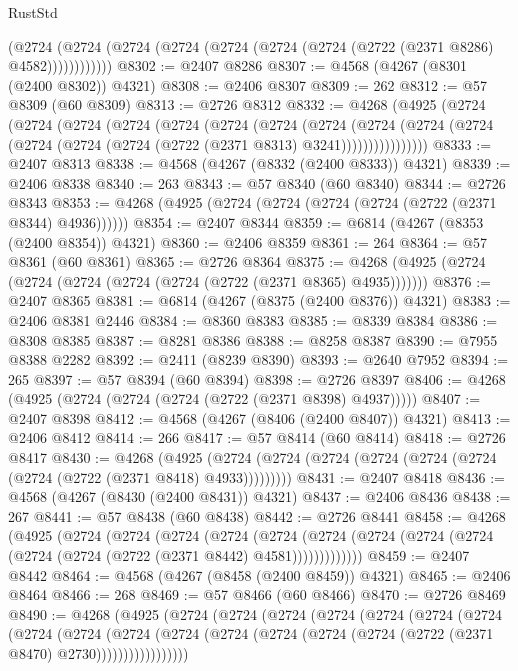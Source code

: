 \begin{lexlean}{RustStd}
\begin{coremodule}
            (@2724 (@2724 (@2724 (@2724 (@2724 (@2724 (@2724 (@2722 (@2371 @8286) @4582))))))))))))
@8302 := @2407 @8286
@8307 := @4568 (@4267 (@8301 (@2400 @8302)) @4321)
@8308 := @2406 @8307
@8309 := 262
@8312 := @57 @8309 (@60 @8309)
@8313 := @2726 @8312
@8332 := @4268
    (@4925
      (@2724
        (@2724
          (@2724
            (@2724
              (@2724
                (@2724
                  (@2724
                    (@2724
                      (@2724
                        (@2724
                          (@2724 (@2724 (@2724 (@2724 (@2722 (@2371 @8313) @3241))))))))))))))))
@8333 := @2407 @8313
@8338 := @4568 (@4267 (@8332 (@2400 @8333)) @4321)
@8339 := @2406 @8338
@8340 := 263
@8343 := @57 @8340 (@60 @8340)
@8344 := @2726 @8343
@8353 := @4268 (@4925 (@2724 (@2724 (@2724 (@2724 (@2722 (@2371 @8344) @4936))))))
@8354 := @2407 @8344
@8359 := @6814 (@4267 (@8353 (@2400 @8354)) @4321)
@8360 := @2406 @8359
@8361 := 264
@8364 := @57 @8361 (@60 @8361)
@8365 := @2726 @8364
@8375 := @4268 (@4925 (@2724 (@2724 (@2724 (@2724 (@2724 (@2722 (@2371 @8365) @4935)))))))
@8376 := @2407 @8365
@8381 := @6814 (@4267 (@8375 (@2400 @8376)) @4321)
@8383 := @2406 @8381 @2446
@8384 := @8360 @8383
@8385 := @8339 @8384
@8386 := @8308 @8385
@8387 := @8281 @8386
@8388 := @8258 @8387
@8390 := @7955 @8388 @2282
@8392 := @2411 (@8239 @8390)
@8393 := @2640 @7952
@8394 := 265
@8397 := @57 @8394 (@60 @8394)
@8398 := @2726 @8397
@8406 := @4268 (@4925 (@2724 (@2724 (@2724 (@2722 (@2371 @8398) @4937)))))
@8407 := @2407 @8398
@8412 := @4568 (@4267 (@8406 (@2400 @8407)) @4321)
@8413 := @2406 @8412
@8414 := 266
@8417 := @57 @8414 (@60 @8414)
@8418 := @2726 @8417
@8430 := @4268
    (@4925 (@2724 (@2724 (@2724 (@2724 (@2724 (@2724 (@2724 (@2722 (@2371 @8418) @4933)))))))))
@8431 := @2407 @8418
@8436 := @4568 (@4267 (@8430 (@2400 @8431)) @4321)
@8437 := @2406 @8436
@8438 := 267
@8441 := @57 @8438 (@60 @8438)
@8442 := @2726 @8441
@8458 := @4268
    (@4925
      (@2724
        (@2724
          (@2724
            (@2724
              (@2724
                (@2724 (@2724 (@2724 (@2724 (@2724 (@2724 (@2722 (@2371 @8442) @4581)))))))))))))
@8459 := @2407 @8442
@8464 := @4568 (@4267 (@8458 (@2400 @8459)) @4321)
@8465 := @2406 @8464
@8466 := 268
@8469 := @57 @8466 (@60 @8466)
@8470 := @2726 @8469
@8490 := @4268
    (@4925
      (@2724
        (@2724
          (@2724
            (@2724
              (@2724
                (@2724
                  (@2724
                    (@2724
                      (@2724
                        (@2724
                          (@2724
                            (@2724 (@2724 (@2724 (@2724 (@2722 (@2371 @8470) @2730)))))))))))))))))

\end{coremodule}
\end{lexlean}
